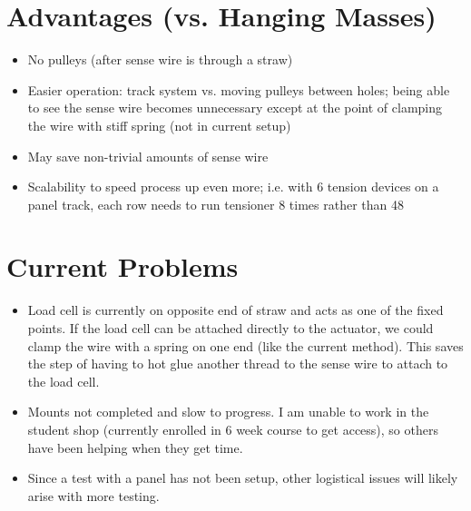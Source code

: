 \documentclass[letterpaper,12pt]{article}
\begin{document}
\section*{Advantages \small{(vs. Hanging Masses)}}
\begin{itemize}
\item{No pulleys (after sense wire is through a straw)
}
\item{Easier operation: track system vs. moving pulleys between holes; being able to see the sense wire becomes unnecessary except at the point of clamping the wire with stiff spring (not in current setup)
}
\item{May save non-trivial amounts of sense wire
}
\item{Scalability to speed process up even more; i.e. with 6 tension devices on a panel track, each row needs to run tensioner 8 times rather than 48
}
\end{itemize}

\section*{Current Problems}
\begin{itemize}
\item{
Load cell is currently on opposite end of straw and acts as one of the fixed points. If the load cell can be attached directly to the actuator, we could clamp the wire with a spring on one end (like the current method). This saves the step of having to hot glue another thread to the sense wire to attach to the load cell.
}
\item{
Mounts not completed and slow to progress. I am unable to work in the student shop (currently enrolled in 6 week course to get access), so others have been helping when they get time.
}
\item{
Since a test with a panel has not been setup, other logistical issues will likely arise with more testing.
}
\end{itemize}
\end{document}
